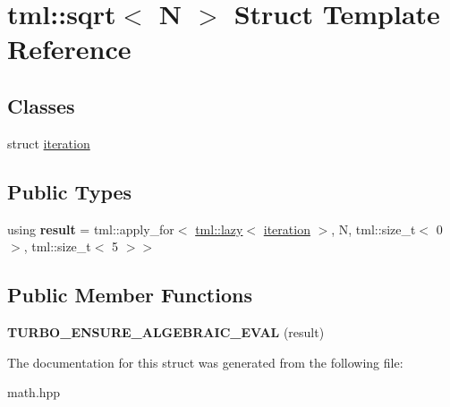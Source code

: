 \hypertarget{structtml_1_1sqrt}{\section{tml\+:\+:sqrt$<$ N $>$ Struct Template Reference}
\label{structtml_1_1sqrt}
}
\subsection*{Classes}
\begin{DoxyCompactItemize}
\item 
struct \hyperlink{structtml_1_1sqrt_1_1iteration}{iteration}
\end{DoxyCompactItemize}
\subsection*{Public Types}
\begin{DoxyCompactItemize}
\item 
\hypertarget{structtml_1_1sqrt_ad31b4715f2ab630d2a65e3cb08778dac}{using {\bfseries result} = tml\+::apply\+\_\+for$<$ \hyperlink{structtml_1_1lazy}{tml\+::lazy}$<$ \hyperlink{structtml_1_1sqrt_1_1iteration}{iteration} $>$, N, tml\+::size\+\_\+t$<$ 0 $>$, tml\+::size\+\_\+t$<$ 5 $>$$>$}\label{structtml_1_1sqrt_ad31b4715f2ab630d2a65e3cb08778dac}

\end{DoxyCompactItemize}
\subsection*{Public Member Functions}
\begin{DoxyCompactItemize}
\item 
\hypertarget{structtml_1_1sqrt_aaf1a9ee217ffd286b029d1077b3d9313}{{\bfseries T\+U\+R\+B\+O\+\_\+\+E\+N\+S\+U\+R\+E\+\_\+\+A\+L\+G\+E\+B\+R\+A\+I\+C\+\_\+\+E\+V\+A\+L} (result)}\label{structtml_1_1sqrt_aaf1a9ee217ffd286b029d1077b3d9313}

\end{DoxyCompactItemize}


The documentation for this struct was generated from the following file\+:\begin{DoxyCompactItemize}
\item 
math.\+hpp\end{DoxyCompactItemize}
